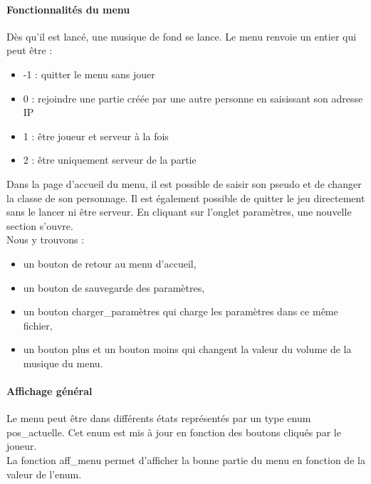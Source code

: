 \documentclass[11pt]{article}
\begin{document}
                \paragraph{Fonctionnalités du menu}
                Dès qu’il est lancé, une musique de fond se lance. Le menu renvoie un entier qui peut être :
                \begin{itemize}
                    \item-1 : quitter le menu sans jouer
                    \item 0 : rejoindre une partie créée par une autre personne en saisissant son adresse IP
                    \item 1 : être joueur et serveur à la fois
                    \item 2 : être uniquement serveur de la partie
                \end{itemize}
                Dans la page d’accueil du menu, il est possible de saisir son pseudo et de changer la classe de son personnage. Il est également possible de quitter le jeu directement sans le lancer ni être serveur. En cliquant sur l’onglet paramètres, une nouvelle section s’ouvre.\\ 
                Nous y trouvons : 
                \begin{itemize}
                    \item un bouton de retour au menu d’accueil,
                    \item un bouton de sauvegarde des paramètres,
                    \item un bouton charger_paramètres qui charge les paramètres dans ce même fichier,
                    \item un bouton plus et un bouton moins qui changent la valeur du volume de la musique du menu.
                \end{itemize}
   
                \paragraph{Affichage général}\leavevmode\newline
                Le menu peut être dans différents états représentés par un type enum pos\_actuelle. Cet enum est mis à jour en fonction des boutons cliqués par le joueur.  \\
                La fonction aff\_menu permet d’afficher la bonne partie du menu en fonction de la valeur de l’enum. 
                                
\end{document}

